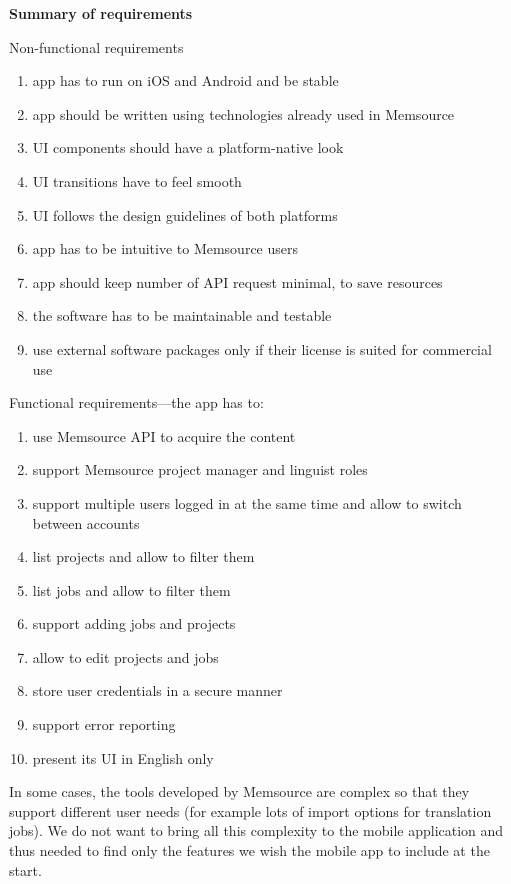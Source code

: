 {\bf Summary of requirements}

Non-functional requirements
\begin{enumerate}
	\item app has to run on iOS and Android and be stable
	\item app should be written using technologies already used in Memsource
	\item UI components should have a platform-native look
	\item UI transitions have to feel smooth
	\item UI follows the design guidelines of both platforms
	\item app has to be intuitive to Memsource users
	\item app should keep number of API request minimal, to save resources
	\item the software has to be maintainable and testable
	\item use external software packages only if their license is suited for commercial use
\end{enumerate}

Functional requirements---the app has to:
\begin{enumerate}
	\item use Memsource API to acquire the content
	\item support Memsource project manager and linguist roles
	\item support multiple users logged in at the same time and allow to switch between accounts
	\item list projects and allow to filter them
	\item list jobs and allow to filter them
	\item support adding jobs and projects
	\item allow to edit projects and jobs
	\item store user credentials in a secure manner
	\item support error reporting 
	\item present its UI in English only
\end{enumerate}

In some cases, the tools developed by Memsource are complex so that they support different user needs (for example lots of import options for translation jobs). We do not want to bring all this complexity to the mobile application and thus needed to find only the features we wish the mobile app to include at the start. 


